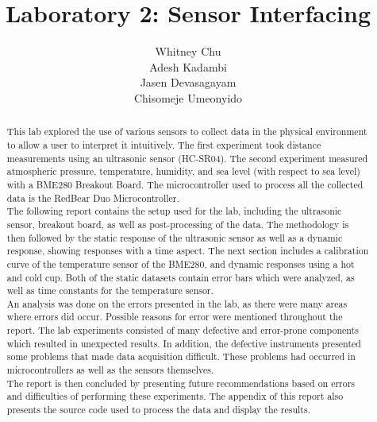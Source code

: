 \documentclass[11pt]{article}
\title{ \textbf{Laboratory 2: Sensor Interfacing}}
\author{
	\begin{tabular}{c}
	    Whitney Chu\\
		Adesh Kadambi\\
		Jasen Devasagayam\\
		Chisomeje Umeonyido\\\\
	\end{tabular}
	
}
\date{}
\begin{document}
\begin{titlepage}
    \centering
    \maketitle
    \thispagestyle{empty}
\end{titlepage}

\newpage
\renewcommand{\abstractname}{Executive Summary}
\begin{abstract}
\thispagestyle{empty}
This lab explored the use of various sensors to collect data in the physical environment to allow a user to interpret it intuitively. The first experiment took distance measurements using an ultrasonic sensor (HC-SR04). The second experiment measured atmospheric pressure, temperature, humidity, and sea level (with respect to sea level) with a BME280 Breakout Board. The microcontroller used to process all the collected data is the RedBear Duo Microcontroller.\\

The following report contains the setup used for the lab, including the ultrasonic sensor, breakout board, as well as post-processing of the data. The methodology is then followed by the static response of the ultrasonic sensor as well as a dynamic response, showing responses with a time aspect. The next section includes a calibration curve of the temperature sensor of the BME280, and dynamic responses using a hot and cold cup. Both of the static datasets contain error bars which were analyzed, as well as time constants for the temperature sensor. \\

An analysis was done on the errors presented in the lab, as there were many areas where errors did occur. Possible reasons for error were mentioned throughout the report. The lab experiments consisted of many defective and error-prone components which resulted in unexpected results. In addition, the defective instruments presented some problems that made data acquisition difficult. These problems had occurred in microcontrollers as well as the sensors themselves.\\

The report is then concluded by presenting future recommendations based on errors and difficulties of performing these experiments. The appendix of this report also presents the source code used to process the data and display the results. 
\end{abstract}

\pagebreak
\end{document}
